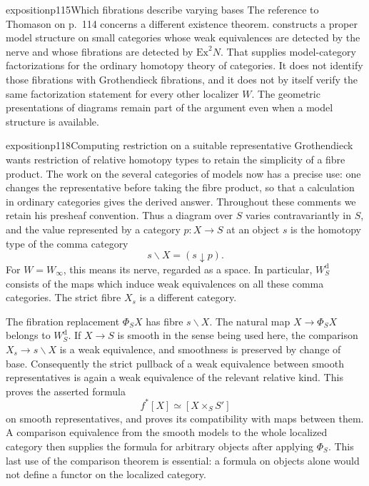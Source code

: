 \begin{dcomment}{exposition}{p115}{Which fibrations describe varying bases}
The reference to Thomason on p.~114 concerns a different existence theorem. \citet[Theorem~4.9 and Corollary~5.5]{Thomason1980} constructs a proper model structure on small categories whose weak equivalences are detected by the nerve and whose fibrations are detected by $\mathrm{Ex}^2N$. That supplies model-category factorizations for the ordinary homotopy theory of categories. It does not identify those fibrations with Grothendieck fibrations, and it does not by itself verify the same factorization statement for every other localizer $W$. The geometric presentations of diagrams remain part of the argument even when a model structure is available.
\end{dcomment}


\begin{dcomment}{exposition}{p118}{Computing restriction on a suitable representative}
Grothendieck wants restriction of relative homotopy types to retain the simplicity of a fibre product. The work on the several categories of models now has a precise use: one changes the representative before taking the fibre product, so that a calculation in ordinary categories gives the derived answer. Throughout these comments we retain his presheaf convention. Thus a diagram over $S$ varies contravariantly in $S$, and the value represented by a category $p:X\to S$ at an object $s$ is the homotopy type of the comma category
\[
 s\backslash X=(s\downarrow p).
\]
For $W=W_\infty$, this means its nerve, regarded as a space. In particular, $W_S^{\mathrm d}$ consists of the maps which induce weak equivalences on all these comma categories. The strict fibre $X_s$ is a different category.

The fibration replacement $\Phi_SX$ has fibre $s\backslash X$. The natural map $X\to\Phi_SX$ belongs to $W_S^{\mathrm d}$. If $X\to S$ is smooth in the sense being used here, the comparison $X_s\to s\backslash X$ is a weak equivalence, and smoothness is preserved by change of base. Consequently the strict pullback of a weak equivalence between smooth representatives is again a weak equivalence of the relevant relative kind. This proves the asserted formula
\[
 f^*[X]\simeq[X\times_S S']
\]
on smooth representatives, and proves its compatibility with maps between them. A comparison equivalence from the smooth models to the whole localized category then supplies the formula for arbitrary objects after applying $\Phi_S$. This last use of the comparison theorem is essential: a formula on objects alone would not define a functor on the localized category.


\end{dcomment}
